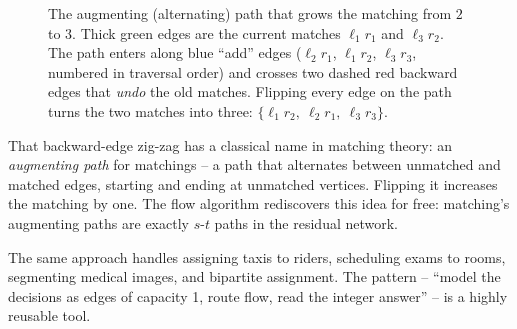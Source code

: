 \begin{figure}[H]
\centering
{}
\caption{The augmenting (alternating) path that grows the matching from $2$ to
$3$. Thick green edges are the current matches $\ell_1 r_1$ and $\ell_3 r_2$.
The path enters along blue ``add'' edges ($\ell_2 r_1$, $\ell_1 r_2$, $\ell_3
r_3$, numbered in traversal order) and crosses two dashed red backward edges
that \emph{undo} the old matches. Flipping every edge on the path turns the two
matches into three: $\{\ell_1 r_2,\ \ell_2 r_1,\ \ell_3 r_3\}$.}
\label{ch26:fig-matching-aug}
\end{figure}

\begin{focusbox}
That backward-edge zig-zag has a classical name in matching theory: an
\emph{augmenting path} for matchings -- a path that alternates between unmatched
and matched edges, starting and ending at unmatched vertices. Flipping it
increases the matching by one. The flow algorithm rediscovers this idea for
free: matching's augmenting paths are exactly $s$-$t$ paths in the residual
network.
\end{focusbox}

\begin{aestheticbox}
The same approach handles assigning taxis to riders,
scheduling exams to rooms, segmenting medical images,
and bipartite assignment. The pattern -- ``model the decisions as
edges of capacity 1, route flow, read the integer answer'' -- is a highly reusable tool.
\end{aestheticbox}

